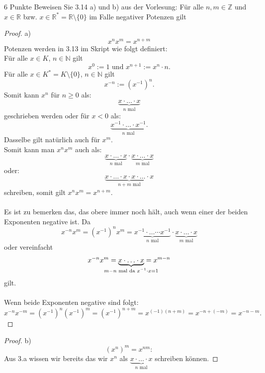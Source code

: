 \documentclass{problemset}
\begin{document}
\begin{problem}{6 Punkte}
Beweisen Sie 3.14 a) und b) aus der Vorlesung:
\newline\newline
Für alle $n,m \in \mathbb{Z}$ und $x \in \mathbb{R}$ bzw. $x \in \mathbb{R}^* = \mathbb{R}\setminus\{0\}$ im Falle negativer Potenzen gilt
\begin{proof}
    a)
    \begin{displaymath}
        x^nx^m = x^{n+m}
    \end{displaymath}
    Potenzen werden in 3.13 im Skript wie folgt definiert: \\
    Für alle $x \in K$, $n \in \mathbb{N}$ gilt
    \[
        x^0 := 1 \text{ und } x^{n+1}:=x^n \cdot n.
    \]
    Für alle $x \in K^*=K\setminus\{0\}$, $n \in \mathbb{N}$ gilt \[
        x^{-n} := (x^{-1})^n.
    \]
    Somit kann $x^n$ für $n \ge 0$ als: \[
        \underbrace{x \cdot \ldots \cdot x}_{n\text{ mal}}
    \] geschrieben werden oder für $x < 0$ als: \[
        \underbrace{x^{-1} \cdot \ldots \cdot x^{-1}}_{n\text{ mal}}.
    \]
    Dasselbe gilt natürlich auch für $x^m$. \\ Somit kann man $x^nx^m$ auch als: \[
        \underbrace{x \cdot \ldots \cdot x}_{n\text{ mal}} \cdot \underbrace{x \cdot \ldots \cdot x}_{m\text{ mal}}
    \] oder: \[
        \underbrace{x \cdot \ldots \cdot x \cdot x \cdot \ldots \cdot x}_{n+m\text{ mal}}
    \] schreiben, somit gilt $x^nx^m = x^{n+m}$. \\ \\ Es ist zu bemerken das, das
    obere immer noch hält, auch wenn einer der beiden Exponenten negative ist. Da \[
        x^{-n}x^m = {(x^{-1})}^nx^m = \underbrace{x^{-1} \cdot\ldots\cdots x^{-1}}_{n\text{ mal}} \cdot \underbrace{x \cdot \ldots \cdot x}_{m\text{ mal}}
    \] oder vereinfacht \[
        x^{-n}x^m = \underbrace{x \cdot \ldots \cdot x}_{\mathclap{m - n\text{ mal da } x^{-1} \cdot x = 1}} = x^{m-n}
    \] gilt. \\ \\ Wenn beide Exponenten negative sind folgt: \[
        x^{-n}x^{-m} = {(x^{-1})}^n{(x^{-1})}^m = {(x^{-1})}^{n+m} = x^{(-1)(n+m)} = x^{-n+(-m)} = x^{-n-m}.
    \]
\end{proof}
\begin{proof}
    b)
    \begin{displaymath}
        {(x^n)}^m = x^{nm}:
    \end{displaymath}
    Aus 3.a wissen wir bereits das wir $x^n$ als $\underbrace{x \cdot \ldots \cdot x}_{n\text{ mal}}$ schreiben können.

\end{proof}
\end{problem}
\end{document}
